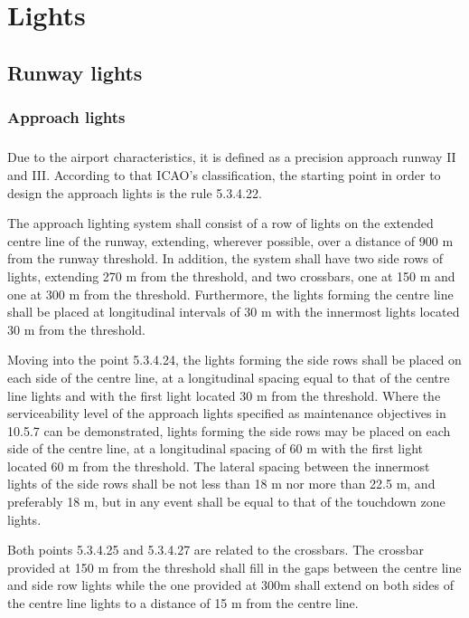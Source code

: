 \chapter{Lights} %

	\section{Runway lights}
		\subsection{Approach lights}
		\paragraph{}Due to the airport characteristics, it is defined as a precision approach runway II and III. According to that ICAO's classification, the starting point in order to design the approach lights is the rule 5.3.4.22. 
		
		The approach lighting system shall consist of a row of lights on the extended centre line of the runway, extending, wherever possible, over a distance of 900 m from the runway threshold. In addition, the system shall have two side rows of lights, extending 270 m from the threshold, and two crossbars, one at 150 m and one at 300 m from the threshold. Furthermore, the lights forming the centre line shall be placed at longitudinal intervals of 30 m with the innermost lights located 30 m from the threshold.
		 
		Moving into the point 5.3.4.24, the lights forming the side rows shall be placed on each side of the centre line, at a longitudinal spacing equal to that of the centre line lights and with the first light located 30 m from the threshold. Where the serviceability level of the approach lights specified as maintenance objectives in 10.5.7 can be demonstrated, lights forming the side rows may be placed on each side of the centre line, at a longitudinal spacing of 60 m with the first light located 60 m from the threshold. The lateral spacing between the innermost lights of the side rows shall be not less than 18 m nor more than 22.5 m, and preferably 18 m, but in any event shall be equal to that of the touchdown zone lights.
		
		Both points 5.3.4.25 and 5.3.4.27 are related to the crossbars. The crossbar provided at 150 m from the threshold shall fill in the gaps between the centre line and side row lights while the one provided at 300m shall extend on both sides of the centre line lights to a distance of 15 m from the centre line.
		
